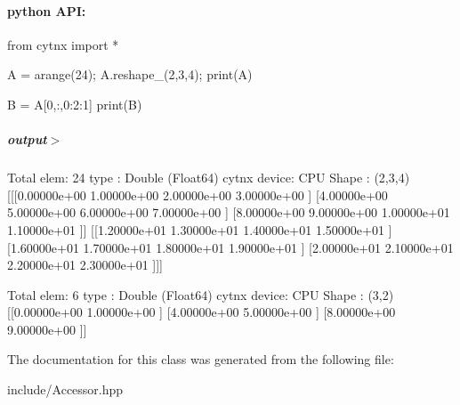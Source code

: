  \paragraph*{python A\+PI\+:}


\begin{DoxyCodeInclude}
\textcolor{keyword}{from} cytnx \textcolor{keyword}{import} *

A = arange(24);
A.reshape\_(2,3,4);
print(A)


B = A[0,:,0:2:1]
print(B)

\end{DoxyCodeInclude}
 \subparagraph*{output$>$}


\begin{DoxyVerbInclude}

Total elem: 24
type  : Double (Float64)
cytnx device: CPU
Shape : (2,3,4)
[[[0.00000e+00 1.00000e+00 2.00000e+00 3.00000e+00 ]
  [4.00000e+00 5.00000e+00 6.00000e+00 7.00000e+00 ]
  [8.00000e+00 9.00000e+00 1.00000e+01 1.10000e+01 ]]
 [[1.20000e+01 1.30000e+01 1.40000e+01 1.50000e+01 ]
  [1.60000e+01 1.70000e+01 1.80000e+01 1.90000e+01 ]
  [2.00000e+01 2.10000e+01 2.20000e+01 2.30000e+01 ]]]



Total elem: 6
type  : Double (Float64)
cytnx device: CPU
Shape : (3,2)
[[0.00000e+00 1.00000e+00 ]
 [4.00000e+00 5.00000e+00 ]
 [8.00000e+00 9.00000e+00 ]]




\end{DoxyVerbInclude}
 

The documentation for this class was generated from the following file\+:\begin{DoxyCompactItemize}
\item 
include/Accessor.\+hpp\end{DoxyCompactItemize}
